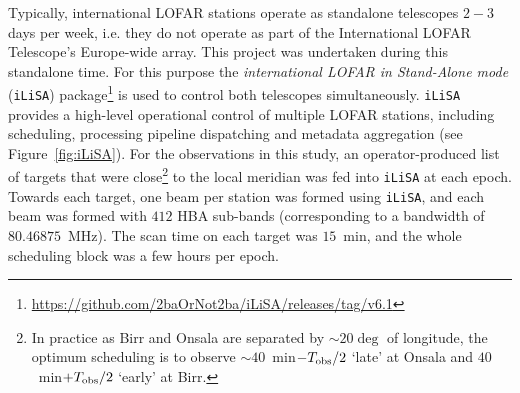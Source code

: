 Typically, international LOFAR stations operate as standalone telescopes $2-3$ days per week, i.e. they do not operate as part of the International LOFAR Telescope's Europe-wide array. This project was undertaken during this standalone time. For this purpose the \emph{international LOFAR in Stand-Alone mode} (\texttt{iLiSA}) package\footnote{\url{https://github.com/2baOrNot2ba/iLiSA/releases/tag/v6.1}} is used to control both telescopes simultaneously. \texttt{iLiSA} provides a high-level operational control of multiple LOFAR stations, including scheduling, processing pipeline dispatching and metadata aggregation (see Figure~\ref{fig:iLiSA}). For the observations in this study, an operator-produced list of targets that were close\footnote{In practice as Birr and Onsala are separated by $\sim20\deg$ of longitude, the optimum scheduling is to observe $\sim 40$~min$-T_{\rm obs}/2$ `late' at Onsala and $40$~min$+T_{\rm obs}/2$ `early' at Birr.} to the local meridian was fed into \texttt{iLiSA} at each epoch. Towards each target, one beam per station was formed using \texttt{iLiSA}, and each beam was formed with $412$ HBA sub-bands (corresponding to a bandwidth of $80.46875$~MHz). The scan time on each target was $15$~min, and the whole scheduling block was a few hours per epoch.


